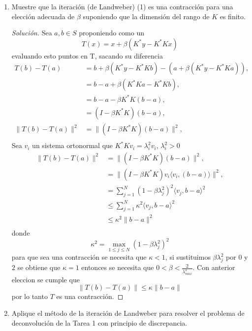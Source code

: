 \documentclass[12pt,spanish,mexico]{article}
\numberwithin{equation}{section}
\theoremstyle{definition}
\theoremstyle{remark}
\newenvironment{solution}{\begin{proof}[Solución]}{\end{proof}}
\begin{document}
\begin{enumerate}
    \item[(a)] Muestre que la iteración (de Landweber) (1) es una contracción para una elección adecuada de \( \beta \) suponiendo que la dimensión del rango de \( K \) es finito.
    \begin{solution}
        Sea $a,b \in S$ proponiendo como un
        \[
        T(x)=x+\beta(K^* y - K^* K x)
        \]
        evaluando esto puntos en T, sacando su diferencia
        \begin{align*}
        T(b)-T(a) &=b+\beta(K^* y - K^* K b)-(a+\beta(K^* y - K^* K a)),\\
         &=b-a+\beta(K^* K a - K^* K b), \\
         &=b-a-\beta K^* K (b - a), \\
         &=(I-\beta K^* K)(b - a), \\
        \|T(b)-T(a)\|^2 &=\|(I-\beta K^* K)(b - a)\|^2,\\
        \end{align*}
        Sea ${v_i}$ un sistema ortonormal que $K^* K v_i=\lambda_i^2 v_i$, $\lambda_i^2 >0$
        \begin{align*}
        \|T(b)-T(a)\|^2 &=\|(I-\beta K^* K)(b - a)\|^2,\\
         &=\|(I-\beta K^* K)v_i \langle v_i, (b - a) \rangle \|^2,\\
         &=\sum_{j=1}^N (1 -\beta  \lambda_j^2)^2 \langle v_j, b-a \rangle^2 \\
         & \leq \sum_{j=1}^N \kappa^2  \langle v_j, b-a \rangle^2 \\\
         & \leq \kappa^2  \| b-a \|^2 \\
        \end{align*}
        donde 
        \[
        \kappa^2 = \max_{1 \leq j \leq N} (1 -\beta  \lambda_j^2)^2
        \]
        para que sea una contracción se necesita que $\kappa < 1$, si sustituimos $\beta \lambda_j^2$ por $0$ y $2$ se obtiene que 
        $\kappa=1$ entonces se necesita que $0 < \beta < \frac{2}{\lambda_{max}^2}$. Con anterior eleccion se cumple que 
        \[\|T(b)-T(a)\| \leq \kappa \|b-a\| \]
        por lo tanto $T$ es una contracción.
        
    \end{solution}
    \item[(b)] Aplique el método de la iteración de Landweber para resolver el problema de deconvolución de la Tarea 1 con principio de discrepancia.
  

\end{enumerate}
\end{document}
